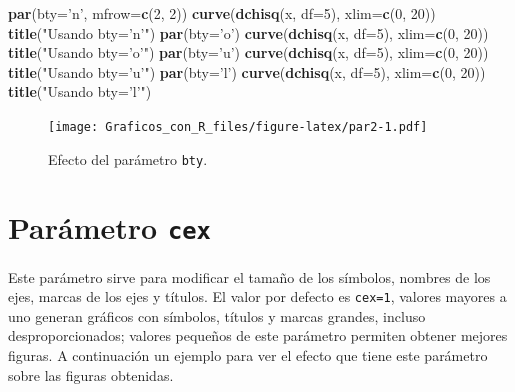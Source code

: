 \documentclass[10pt,]{krantz}
\makeatletter
\newenvironment{Shaded}{\begin{snugshade}}{\end{snugshade}}
\newcommand{\KeywordTok}[1]{\textcolor[rgb]{0.13,0.29,0.53}{\textbf{#1}}}
\newcommand{\DataTypeTok}[1]{\textcolor[rgb]{0.13,0.29,0.53}{#1}}
\newcommand{\DecValTok}[1]{\textcolor[rgb]{0.00,0.00,0.81}{#1}}
\newcommand{\StringTok}[1]{\textcolor[rgb]{0.31,0.60,0.02}{#1}}
\newcommand{\NormalTok}[1]{#1}
\newenvironment{kframe}{%
\medskip{}
\setlength{\fboxsep}{.8em}
 \def\at@end@of@kframe{}%
 \ifinner\ifhmode%
  \def\at@end@of@kframe{\end{minipage}}%
  \begin{minipage}{\columnwidth}%
 \fi\fi%
 \def\FrameCommand##1{\hskip\@totalleftmargin \hskip-\fboxsep
 \colorbox{shadecolor}{##1}\hskip-\fboxsep
     \hskip-\linewidth \hskip-\@totalleftmargin \hskip\columnwidth}%
 \MakeFramed {\advance\hsize-\width
   \@totalleftmargin\z@ \linewidth\hsize
   \@setminipage}}%
 {\par\unskip\endMakeFramed%
 \at@end@of@kframe}
\renewenvironment{Shaded}{\begin{kframe}}{\end{kframe}}
\makeatother
\begin{document}
\begin{Shaded}
\begin{Highlighting}[]
\KeywordTok{par}\NormalTok{(}\DataTypeTok{bty=}\StringTok{'n'}\NormalTok{, }\DataTypeTok{mfrow=}\KeywordTok{c}\NormalTok{(}\DecValTok{2}\NormalTok{, }\DecValTok{2}\NormalTok{))}
\KeywordTok{curve}\NormalTok{(}\KeywordTok{dchisq}\NormalTok{(x, }\DataTypeTok{df=}\DecValTok{5}\NormalTok{), }\DataTypeTok{xlim=}\KeywordTok{c}\NormalTok{(}\DecValTok{0}\NormalTok{, }\DecValTok{20}\NormalTok{))}
\KeywordTok{title}\NormalTok{(}\StringTok{"Usando bty='n'"}\NormalTok{)}
\KeywordTok{par}\NormalTok{(}\DataTypeTok{bty=}\StringTok{'o'}\NormalTok{)}
\KeywordTok{curve}\NormalTok{(}\KeywordTok{dchisq}\NormalTok{(x, }\DataTypeTok{df=}\DecValTok{5}\NormalTok{), }\DataTypeTok{xlim=}\KeywordTok{c}\NormalTok{(}\DecValTok{0}\NormalTok{, }\DecValTok{20}\NormalTok{))}
\KeywordTok{title}\NormalTok{(}\StringTok{"Usando bty='o'"}\NormalTok{)}
\KeywordTok{par}\NormalTok{(}\DataTypeTok{bty=}\StringTok{'u'}\NormalTok{)}
\KeywordTok{curve}\NormalTok{(}\KeywordTok{dchisq}\NormalTok{(x, }\DataTypeTok{df=}\DecValTok{5}\NormalTok{), }\DataTypeTok{xlim=}\KeywordTok{c}\NormalTok{(}\DecValTok{0}\NormalTok{, }\DecValTok{20}\NormalTok{))}
\KeywordTok{title}\NormalTok{(}\StringTok{"Usando bty='u'"}\NormalTok{)}
\KeywordTok{par}\NormalTok{(}\DataTypeTok{bty=}\StringTok{'l'}\NormalTok{)}
\KeywordTok{curve}\NormalTok{(}\KeywordTok{dchisq}\NormalTok{(x, }\DataTypeTok{df=}\DecValTok{5}\NormalTok{), }\DataTypeTok{xlim=}\KeywordTok{c}\NormalTok{(}\DecValTok{0}\NormalTok{, }\DecValTok{20}\NormalTok{))}
\KeywordTok{title}\NormalTok{(}\StringTok{"Usando bty='l'"}\NormalTok{)}
\end{Highlighting}
\end{Shaded}

\begin{figure}
\centering
\texttt{[image: Graficos\_con\_R\_files/figure-latex/par2-1.pdf]}
\caption{\label{fig:par2}Efecto del parámetro \texttt{bty}.}
\end{figure}

\section{\texorpdfstring{Parámetro \texttt{cex}
}{Parámetro cex  }}\label{parametro-cex}

Este parámetro sirve para modificar el tamaño de los símbolos, nombres
de los ejes, marcas de los ejes y títulos. El valor por defecto es
\texttt{cex=1}, valores mayores a uno generan gráficos con símbolos,
títulos y marcas grandes, incluso desproporcionados; valores pequeños de
este parámetro permiten obtener mejores figuras. A continuación un
ejemplo para ver el efecto que tiene este parámetro sobre las figuras
obtenidas.
\end{document}
